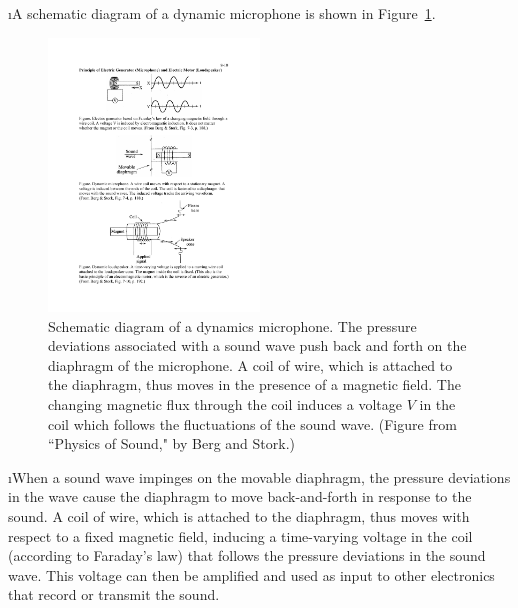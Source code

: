 \i A schematic diagram of a dynamic microphone is shown in 
Figure~\ref{f:microphone}.
%
\begin{figure}[htbp]
\begin{center}
\includegraphics[width=0.5\textwidth]{microphone}
\caption{Schematic diagram of a dynamics microphone.
The pressure deviations associated with a sound wave
push back and forth on the diaphragm of the microphone.
A coil of wire, which is attached to the diaphragm, 
thus moves in the presence of a magnetic field.
The changing magnetic flux through the coil induces a voltage 
$V$ in the coil which follows the fluctuations of the sound wave.
(Figure from ``Physics of Sound," by Berg and Stork.)} 
\label{f:microphone}
\end{center}
\end{figure}
%

\i When a sound wave impinges on the movable diaphragm, 
the pressure deviations in the wave cause the diaphragm 
to move back-and-forth in response to the sound.
A coil of wire, which is attached to the diaphragm, thus 
moves with respect to a fixed magnetic field, inducing a
time-varying voltage in the coil (according to Faraday's
law) that follows the pressure deviations in the sound wave.
This voltage can then be amplified and used as input 
to other electronics that record or transmit the sound. 

